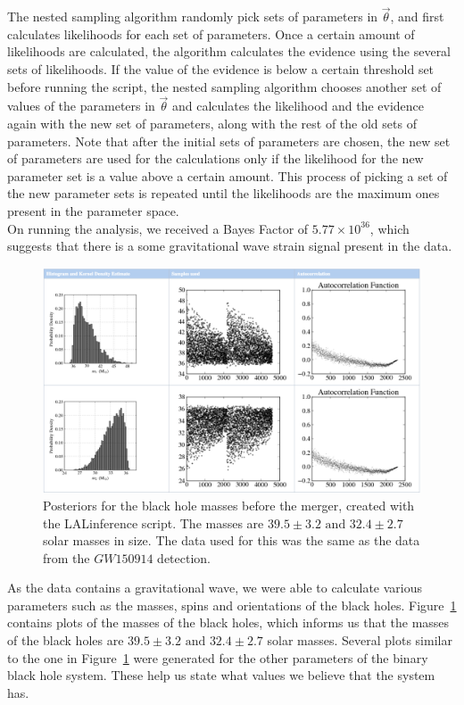 \documentclass{article}
\begin{document}
 The nested sampling algorithm randomly pick sets of parameters in $\vec{\theta}$, and first calculates likelihoods for each set of parameters. Once a certain amount of likelihoods are calculated, the algorithm calculates the evidence using the several sets of likelihoods. If the value of the evidence is below a certain threshold set before running the script, the nested sampling algorithm chooses another set of values of the parameters in $\vec{\theta}$ and calculates the likelihood and the evidence again with the new set of parameters, along with the rest of the old sets of parameters. Note that after the initial sets of parameters are chosen, the new set of parameters are used for the calculations only if the likelihood for the new parameter set is a value above a certain amount. This process of picking a set of the new parameter sets is repeated until the likelihoods are the maximum ones present in the parameter space.\\
 
 
  On running the analysis, we received a Bayes Factor of $5.77\times 10^{36}$, which suggests that there is a some gravitational wave strain signal present in the data.\\
 
      \begin{figure}[h]
      	\centering
      	\includegraphics[width=1\textwidth]{Figures/LALinferenceMasses.png} 
      	\caption{Posteriors for the black hole masses before the merger, created with the LALinference script. The masses are $39.5\pm3.2 \text{ and } 32.4\pm2.7$ solar masses in size. The data used for this was the same as the data from the $GW150914$ detection.}
      	\label{Fig:LALinferenceMasses}
      \end{figure}
      
      
 As the data contains a gravitational wave, we were able to calculate various parameters such as the masses, spins and orientations of the black holes. Figure~\ref{Fig:LALinferenceMasses} contains plots of the masses of the black holes, which informs us that the masses of the black holes are $39.5\pm3.2 \text{ and } 32.4\pm2.7$ solar masses. Several plots similar to the one in Figure~\ref{Fig:LALinferenceMasses} were generated for the other parameters of the binary black hole system. These help us state what values we believe that the system has. \\
 
\end{document}

